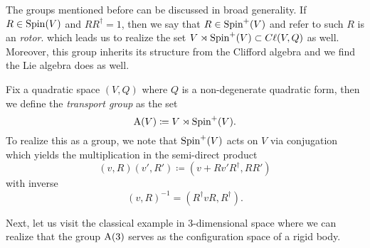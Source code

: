 \documentclass[conf]{new-aiaa}
\begin{document}
The groups mentioned before can be discussed in broad generality.  If $R\in \operatorname{Spin}(V)$ and $RR^\dagger = 1$, then we say that $R\in \operatorname{Spin}^+(V)$ and refer to such $R$ is an \emph{rotor}. which leads us to realize the set $V\rtimes \operatorname{Spin}^+(V) \subset C\ell(V,Q)$ as well. Moreover, this group inherits its structure from the Clifford algebra and we find the Lie algebra does as well. 

\begin{definition}
Fix a quadratic space $(V,Q)$ where $Q$ is a non-degenerate quadratic form, then we define the \emph{transport group} as the set
\begin{equation}
\operatorname{A}(V)\coloneqq V\rtimes \operatorname{Spin}^+(V).
\end{equation}
To realize this as a group, we note that $\operatorname{Spin}^+(V)$ acts on $V$ via conjugation which yields the multiplication in the semi-direct product
\begin{equation}
\label{eq:product_in_A}
(v,R)(v',R')\coloneqq(v+Rv'R^\dagger, RR')
\end{equation}
with inverse
\begin{equation}
(v,R)^{-1} = (R^\dagger v R, R^\dagger).
\end{equation}
\end{definition}

Next, let us visit the classical example in 3-dimensional space where we can realize that the group $\operatorname{A}(3)$ serves as the configuration space of a rigid body.
\end{document}
